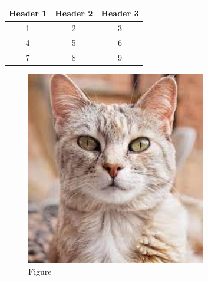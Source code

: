 \documentclass{article}
\begin{document}
\begin{table}[h!]
\centering
\begin{tabular}{c | c | c }
\hline
Header 1 & Header 2 & Header 3 \\
\hline
1 & 2 & 3 \\
\hline
4 & 5 & 6 \\
\hline
7 & 8 & 9 \\
\hline
\end{tabular}
\end{table}
\begin{figure}[h!]
\centering
\includegraphics[width=0.7\textwidth]{artifacts/data/cat.png}
\caption{Figure}
\label{fig:my_label}
\end{figure}
\end{document}
